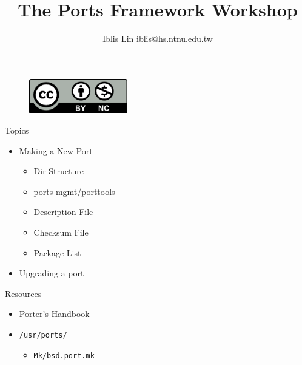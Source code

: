 \documentclass[aspectratio=169]{beamer}
\title{The Ports Framework Workshop}
\author{Iblis Lin \textlangle{}iblis@hs.ntnu.edu.tw\textrangle{}}
\begin{document}
\begin{frame}
  \titlepage

\end{frame}

\begin{frame}[t,fragile]{}
  \begin{figure}
    \includegraphics[height=1.5cm]{by-nc.png}
  \end{figure}
\end{frame}

\begin{frame}[t,fragile]{Topics}
  \begin{itemize}
    \item Making a New Port
      \begin{itemize}
        \item Dir Structure
        \item ports-mgmt/porttools
        \item Description File
        \item Checksum File
        \item Package List
      \end{itemize}
    \item Upgrading a port
  \end{itemize}
\end{frame}

\begin{frame}[t,fragile]{Resources}
  \begin{itemize}
    \item \href{https://www.freebsd.org/doc/en_US.ISO8859-1/books/porters-handbook/book.html}{Porter's Handbook}
    \item \verb|/usr/ports/|
      \begin{itemize}
        \item \verb|Mk/bsd.port.mk|
      \end{itemize}
  \end{itemize}
\end{frame}
\end{document}
